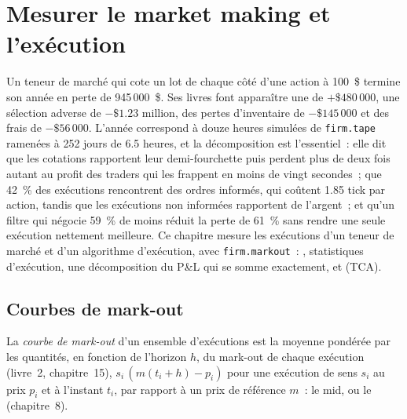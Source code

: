 \chapter{Mesurer le market making et l'exécution}\label{ch:rs:measuring-market-making-and-execution}

Un teneur de marché qui cote un lot de chaque côté d'une action à 100~\$ termine son année en perte de 945\,000~\$. Ses livres font apparaître une  de $+\$480\,000$, une sélection adverse
de $-\$1.23$ million, des pertes d'inventaire de $-\$145\,000$ et des frais de $-\$56\,000$. L'année correspond à douze heures simulées de \texttt{firm.tape} ramenées à 252 jours
de 6.5 heures, et la décomposition est l'essentiel~: elle dit que les cotations rapportent leur demi-fourchette puis perdent plus de deux fois autant au profit des traders qui
les frappent en moins de vingt secondes~; que 42~\% des exécutions rencontrent des ordres informés, qui coûtent 1.85 tick par action, tandis que les exécutions non informées rapportent de l'argent~; et
qu'un filtre qui négocie 59~\% de moins réduit la perte de 61~\% sans rendre une seule exécution nettement meilleure. Ce chapitre mesure les exécutions d'un teneur de marché et
d'un algorithme d'exécution, avec \texttt{firm.markout}~: , statistiques d'exécution, une décomposition du P\&L qui se somme exactement, et  (TCA).

\section{Courbes de mark-out}

\begin{definition}\label{def:rs:measuring-market-making-and-execution:curve}
La \emph{courbe de mark-out} d'un ensemble d'exécutions est la moyenne pondérée par les quantités, en fonction de l'horizon $h$, du mark-out de chaque exécution
(livre~2, chapitre~15), $s_i\,(m(t_i + h) - p_i)$ pour une exécution de sens $s_i$ au prix $p_i$ et à l'instant $t_i$, par rapport à un prix de référence $m$~: le mid, ou le
 (chapitre~8).
\end{definition}

